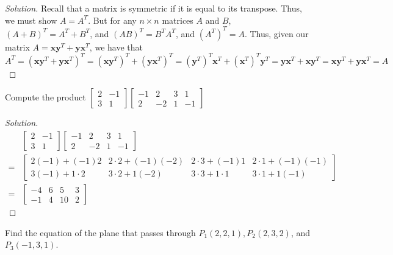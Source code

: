 \documentclass[../main.tex]{subfiles}
\begin{document}
\begin{proof}[Solution]
Recall that a matrix is symmetric if it is equal to its transpose. Thus, we must show $A = A^T$. But for any $n\times n$ matrices $A$ and $B$, $(A+B)^T = A^T + B^T$, and $(AB)^T = B^T A^T$, and $(A^T)^T = A$. Thus, given our matrix $A= \mathbf{x}\mathbf{y}^T + \mathbf{y}\mathbf{x}^T$, we have that $A^T = (\mathbf{x}\mathbf{y}^T + \mathbf{y}\mathbf{x}^T)^T = (\mathbf{x}\mathbf{y}^T)^T + (\mathbf{y}\mathbf{x}^T)^T = (\mathbf{y}^T)^T\mathbf{x}^T + (\mathbf{x}^T)^T\mathbf{y}^T = \mathbf{y}\mathbf{x}^T + \mathbf{x}\mathbf{y}^T = \mathbf{x}\mathbf{y}^T + \mathbf{y}\mathbf{x}^T = A$
\end{proof}
%
\begin{problem}
Compute the product $\begin{bmatrix} 2 & -1 \\ 3 & 1\end{bmatrix} \begin{bmatrix} -1 & 2 & 3 & 1 \\ 2 & -2 & 1 & -1 \end{bmatrix}$
\end{problem}
\begin{proof}[Solution]
\begin{align*}
    &\begin{bmatrix} 2 & -1 \\ 3 & 1\end{bmatrix} \begin{bmatrix} -1 & 2 & 3 & 1 \\ 2 & -2 & 1 & -1 \end{bmatrix}\\
    =&\begin{bmatrix} 2(-1)+(-1)2 & 2\cdot 2 + (-1)(-2) & 2\cdot 3 + (-1)1 & 2\cdot 1 + (-1)(-1) \\ 3(-1)+1\cdot 2 & 3\cdot 2 + 1(-2) & 3\cdot 3 + 1\cdot 1 & 3\cdot 1 + 1(-1)\end{bmatrix}\\
    =&\begin{bmatrix} -4 & 6 & 5 &3 \\ -1 & 4 & 10 & 2\end{bmatrix}
\end{align*}
\end{proof}
%
\begin{problem}
Find the equation of the plane that passes through $P_{1}(2,2,1),P_{2}(2,3,2)$, and $P_{3}(-1,3,1)$.
\end{problem}
\end{document}
